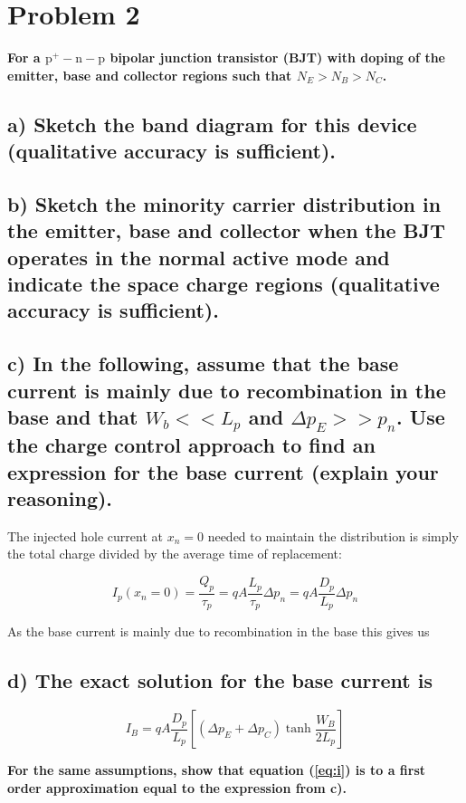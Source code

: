 \section{Problem 2}
\textbf{For a $\mathrm{p}^{+}-\mathrm{n}-\mathrm{p}$ bipolar junction transistor (BJT) with doping of the emitter, base and collector regions such that $N_E>N_B>N_C$.}
\subsection*{a) Sketch the band diagram for this device (qualitative accuracy is sufficient).}


\subsection*{b) Sketch the minority carrier distribution in the emitter, base and collector when the BJT operates in the normal active mode and indicate the space charge regions (qualitative accuracy is sufficient).}


\subsection*{c) In the following, assume that the base current is mainly due to recombination in the base and that $W_b<<L_p$ and $\Delta p_E>>p_n$. Use the charge control approach to find an expression for the base current (explain your reasoning).}
The injected hole current at $x_n = 0$ needed to maintain
the distribution is simply the total charge divided by the average time of
replacement:

$$
I_p\left(x_n=0\right)=\frac{Q_p}{\tau_p}=q A \frac{L_p}{\tau_p} \Delta p_n=q A \frac{D_p}{L_p} \Delta p_n
$$

As the base current is mainly due to recombination in the base this gives us

\subsection*{d) The exact solution for the base current is}

\begin{equation}
    I_B=q A \frac{D_p}{L_p}\left[\left(\Delta p_E+\Delta p_C\right) \tanh \frac{W_B}{2 L_p}\right]
    \label{eq:i}
\end{equation}


\textbf{For the same assumptions, show that equation (\ref*{eq:i}) is to a first order approximation equal to the expression from c).}